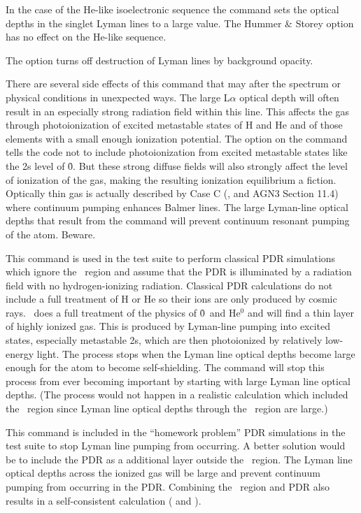 In the case of the He-like isoelectronic sequence
the  command
sets the optical depths in the singlet Lyman lines to a large value.
The
Hummer \& Storey option has no effect on the He-like sequence.

The  option turns off destruction of
Lyman lines by background opacity.

There are several side effects of this command that may after the spectrum
or physical conditions in unexpected ways.
The large L$\alpha $ optical depth will
often result in an especially strong radiation field within this line.
This affects the gas through photoionization of excited metastable states
of H and He and of those elements
with a small enough ionization potential.
The  option on the 
command tells the code not to
include photoionization from excited metastable states like the 2s level
of \h0.
But these strong diffuse fields will also strongly affect the level
of ionization of the gas, making the resulting ionization equilibrium a
fiction.
Optically thin gas is actually described by Case C
(\citealp{Ferland1999}, \citealp{LuridianaEtAl09} and
AGN3 Section 11.4) where continuum pumping enhances Balmer lines.
The large
Lyman-line optical depths that result from the 
command will prevent
continuum resonant pumping of the atom.  Beware.

This command is used in the test suite to perform classical PDR
simulations which ignore the \hplus\ region and assume that the PDR is
illuminated by a radiation field with no hydrogen-ionizing radiation.
Classical PDR calculations do not include a full treatment of H or He so
their ions are only produced by cosmic rays.
\Cloudy\ does a full treatment
of the physics of \h0\ and He$^0$
and will find a thin layer of highly ionized
gas.
This is produced by Lyman-line pumping into excited states, especially
metastable 2s, which are then photoionized by relatively low-energy light.
The process stops when the Lyman line optical depths become large enough
for the atom to become self-shielding.
The  command will stop this
process from ever becoming important by starting with large Lyman line
optical depths.
(The process would not happen in a realistic calculation
which included the \hplus\ region since Lyman line optical depths
through the \hplus\ region are large.)

This command is included in the ``homework problem'' PDR simulations
in the test suite to
stop Lyman line pumping from occurring.
A better solution would be to include
the PDR as a additional layer outside the \hplus\ region.
The Lyman line
optical depths across the ionized gas will be large and prevent continuum
pumping from occurring in the PDR.
Combining the \hii\ region and PDR also
results in a self-consistent calculation
(\citealp{Abel2005} and \citealp{Abel2008} ).

